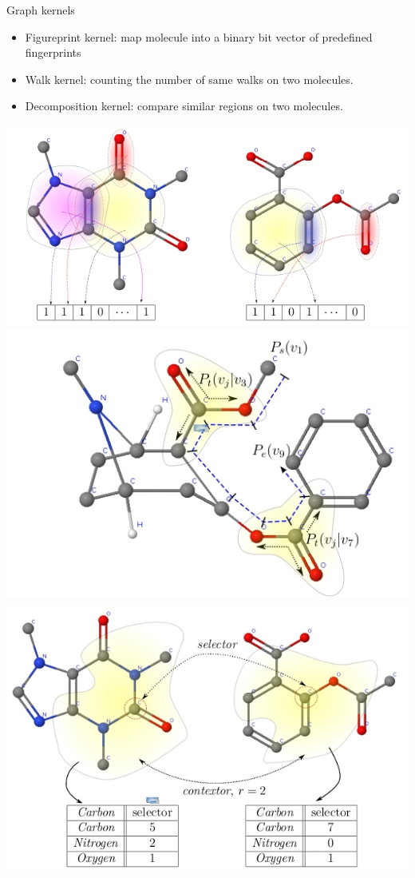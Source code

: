 \documentclass[first=dgreen,second=purple,logo=yellowexc]{aaltoslides}
\begin{document}
{\begin{frame}{Graph kernels}
	\begin{itemize}
		\item Figureprint kernel: map molecule into a binary bit vector of predefined fingerprints
		\item Walk kernel: counting the number of same walks on two molecules.
		\item Decomposition kernel: compare similar regions on two molecules.
		\end{itemize}
	\begin{center}
			\includegraphics[scale=0.25]{./figures/tk.jpg}
			\includegraphics[scale=0.25]{./figures/wk.jpg}
			\includegraphics[scale=0.25]{./figures/dk.jpg}
		\end{center}
\end{frame}

}
\end{document}

